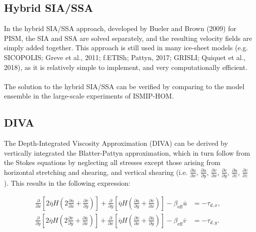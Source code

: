 \documentclass{article}
\begin{document}
\subsection{Hybrid SIA/SSA}

In the hybrid SIA/SSA approach, developed by Bueler and Brown (2009) for PISM, the SIA and SSA are solved separately, and the resulting velocity fields are simply added together. This approach is still used in many ice-sheet models (e.g. SICOPOLIS; Greve et al., 2011; f.ETISh; Pattyn, 2017; GRISLI; Quiquet et al., 2018), as it is relatively simple to implement, and very computationally efficient.\\
\\
The solution to the hybrid SIA/SSA can be verified by comparing to the model ensemble in the large-scale experiments of ISMIP-HOM.

\subsection{DIVA}

The Depth-Integrated Viscosity Approximation (DIVA) can be derived by vertically integrated the Blatter-Pattyn approximation, which in turn follow from the Stokes equations by neglecting all stresses except those arising from horizontal stretching and shearing, and vertical shearing (i.e. $\frac{\partial u}{\partial x}$, $\frac{\partial u}{\partial y}$, $\frac{\partial v}{\partial x}$, $\frac{\partial v}{\partial y}$, $\frac{\partial u}{\partial z}$, $\frac{\partial v}{\partial z}$). This results in the following expression:

\begin{align} \label{eq:DIVA_01}
\frac{\partial}{\partial x} \left[ 2 \overline{\eta} H \left( 2 \frac{\partial \overline{u}}{\partial x} + 
\frac{\partial \overline{v}}{\partial y} \right) \right] + 
\frac{\partial}{\partial y} \left[ \overline{\eta} H \left( \frac{\partial \overline{u}}{\partial y} + 
\frac{\partial \overline{v}}{\partial x} \right) \right] - \beta_{\textrm{eff}} \overline{u} &= -\tau_{d,x}, \\
\frac{\partial}{\partial y} \left[ 2 \overline{\eta} H \left( 2 \frac{\partial \overline{v}}{\partial y} + 
\frac{\partial \overline{u}}{\partial x} \right) \right] + 
\frac{\partial}{\partial x} \left[ \overline{\eta} H \left( \frac{\partial \overline{v}}{\partial x} + 
\frac{\partial \overline{u}}{\partial y} \right) \right] - \beta_{\textrm{eff}} \overline{v} &= -\tau_{d,y}.
\end{align}
\end{document}
